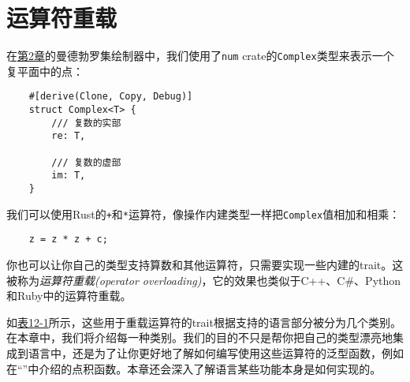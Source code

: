 \chapter{运算符重载}\label{ch12}

在\hyperref[ch02]{第2章}的曼德勃罗集绘制器中，我们使用了\texttt{num} crate的\texttt{Complex}类型来表示一个复平面中的点：
\begin{verbatim}
    #[derive(Clone, Copy, Debug)]
    struct Complex<T> {
        /// 复数的实部
        re: T,

        /// 复数的虚部
        im: T,
    }
\end{verbatim}

我们可以使用Rust的\texttt{+}和\texttt{*}运算符，像操作内建类型一样把\texttt{Complex}值相加和相乘：
\begin{verbatim}
    z = z * z + c;
\end{verbatim}

你也可以让你自己的类型支持算数和其他运算符，只需要实现一些内建的trait。这被称为\emph{运算符重载(operator overloading)}，它的效果也类似于C++、C\#、Python和Ruby中的运算符重载。

如\hyperref[t12-1]{表12-1}所示，这些用于重载运算符的trait根据支持的语言部分被分为几个类别。在本章中，我们将介绍每一种类别。我们的目的不只是帮你把自己的类型漂亮地集成到语言中，还是为了让你更好地了解如何编写使用这些运算符的泛型函数，例如在“”中介绍的点积函数。本章还会深入了解语言某些功能本身是如何实现的。

